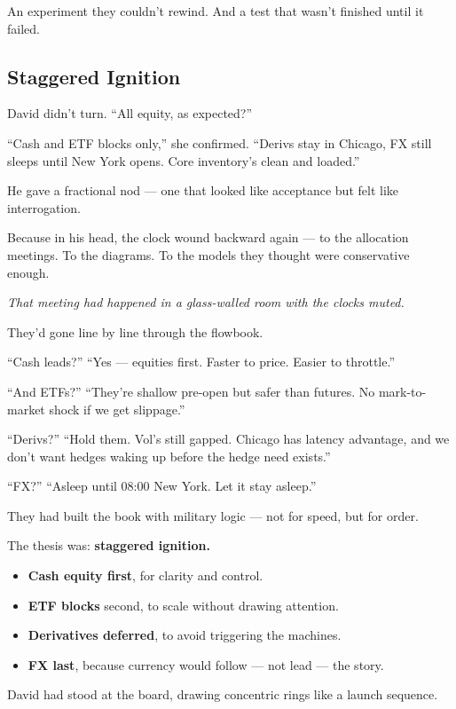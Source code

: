 An experiment they couldn’t rewind.
And a test that wasn’t finished until it failed.

\subsection{Staggered Ignition}

David didn’t turn. “All equity, as expected?”

“Cash and ETF blocks only,” she confirmed. “Derivs stay in Chicago, FX still sleeps until New York opens. 
Core inventory’s clean and loaded.”

He gave a fractional nod — one that looked like acceptance but felt like interrogation.

Because in his head, the clock wound backward again — to the allocation meetings.
To the diagrams.
To the models they thought were conservative enough.

\textit{That meeting had happened in a glass-walled room with the clocks muted.}

They’d gone line by line through the flowbook.

“Cash leads?”
“Yes — equities first. Faster to price. Easier to throttle.”

“And ETFs?”
“They’re shallow pre-open but safer than futures. No mark-to-market shock if we get slippage.”

“Derivs?”
“Hold them. Vol’s still gapped. Chicago has latency advantage, and we don’t want hedges waking up before the hedge need exists.”

“FX?”
“Asleep until 08:00 New York. Let it stay asleep.”

They had built the book with military logic — not for speed, but for order.

The thesis was: \textbf{staggered ignition.}

\begin{itemize}
\item \textbf{Cash equity first}, for clarity and control.
\item \textbf{ETF blocks} second, to scale without drawing attention.
\item \textbf{Derivatives deferred}, to avoid triggering the machines.
\item \textbf{FX last}, because currency would follow — not lead — the story.
\end{itemize}

David had stood at the board, drawing concentric rings like a launch sequence.

